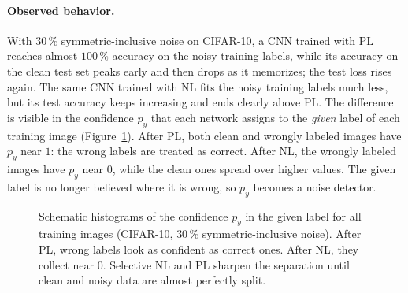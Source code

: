 \paragraph{Observed behavior.}
With $30\,\%$ symmetric-inclusive noise on CIFAR-10, a CNN trained with PL
reaches almost $100\,\%$ accuracy on the noisy training labels, while its
accuracy on the clean test set peaks early and then drops as it memorizes;
the test loss rises again. The same CNN trained with NL fits the noisy
training labels much less, but its test accuracy keeps increasing and ends
clearly above PL. The difference is visible in the confidence $p_y$ that each
network assigns to the \emph{given} label of each training image
(Figure~\ref{fig:nl-hist}). After PL, both clean and wrongly labeled images
have $p_y$ near $1$: the wrong labels are treated as correct. After NL, the
wrongly labeled images have $p_y$ near $0$, while the clean ones spread over
higher values. The given label is no longer believed where it is wrong, so
$p_y$ becomes a noise detector.

\begin{figure}[ht]
  \centering
  \caption{Schematic histograms of the confidence $p_y$ in the given label
  for all training images (CIFAR-10, $30\,\%$ symmetric-inclusive noise).
  After PL, wrong labels look as confident as correct ones. After NL, they
  collect near $0$. Selective NL and PL sharpen the separation until clean
  and noisy data are almost perfectly split.}
  \label{fig:nl-hist}
\end{figure}

